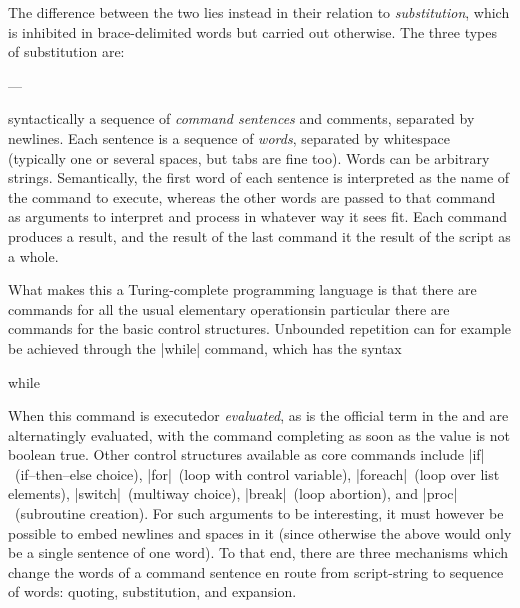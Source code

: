 \documentclass{mtmtcl}
\theoremstyle{plain}
\theoremstyle{remark}
\begin{document}
The difference between the two lies instead in their relation to 
\emph{substitution}, which is inhibited in brace-delimited words but 
carried out otherwise. The three types of substitution are:

---

syntactically a sequence of 
\emph{command sentences} and comments, separated by newlines. Each 
sentence is a sequence of \emph{words}, separated by whitespace 
(typically one or several spaces, but tabs are fine too). Words can 
be arbitrary strings. Semantically, the first word of each sentence 
is interpreted as the name of the command to execute, whereas the 
other words are passed to that command as arguments to interpret 
and process in whatever way it sees fit. Each command produces 
a result, and the result of the last command it the result of the 
script as a whole.

What makes this a Turing-complete programming language is that there 
are commands for all the usual elementary operations\Dash in 
particular there are commands for the basic control structures. 
Unbounded repetition can for example be achieved through the |while| 
command, which has the syntax
\begin{displaysyntax}
  while  
\end{displaysyntax}
When this command is executed\Ldash or \emph{evaluated}, as is the 
official term in \Tcl\Rdash the  and  
are alternatingly evaluated, with the command completing as soon as 
the  value is not boolean true. Other control 
structures available as core commands include |if|~(if--then--else 
choice), |for|~(loop with control variable), |foreach|~(loop over 
list elements), |switch|~(multiway choice), |break|~(loop abortion), 
and |proc|~(subroutine creation).
For such  arguments to be interesting, it must however 
be possible to embed newlines and spaces in it (since otherwise the 
 above would only be a single sentence of one word). 
To that end, there are three mechanisms which change the words of a 
command sentence en route from script-string to sequence of words: 
quoting, substitution, and expansion.
\end{document}
